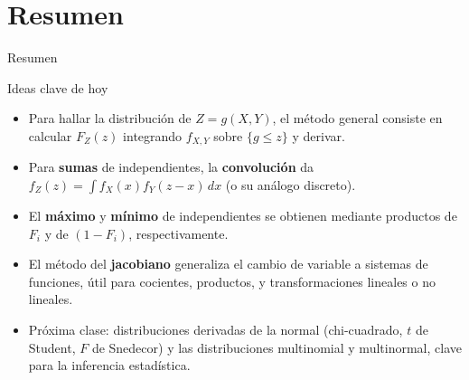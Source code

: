 \documentclass[aspectratio=169,11pt]{beamer}
\begin{document}
\section{Resumen}

\begin{frame}{Resumen}
\begin{block}{Ideas clave de hoy}
\begin{itemize}
\item Para hallar la distribución de $Z=g(X,Y)$, el método general consiste en calcular $F_Z(z)$ integrando $f_{X,Y}$ sobre $\{g\le z\}$ y derivar.
\item Para \textbf{sumas} de independientes, la \textbf{convolución} da $f_Z(z) = \int f_X(x) f_Y(z-x)\,dx$ (o su análogo discreto).
\item El \textbf{máximo} y \textbf{mínimo} de independientes se obtienen mediante productos de $F_i$ y de $(1-F_i)$, respectivamente.
\item El método del \textbf{jacobiano} generaliza el cambio de variable a sistemas de funciones, útil para cocientes, productos, y transformaciones lineales o no lineales.
\item Próxima clase: distribuciones derivadas de la normal (chi-cuadrado, $t$ de Student, $F$ de Snedecor) y las distribuciones multinomial y multinormal, clave para la inferencia estadística.
\end{itemize}
\end{block}
\end{frame}
\end{document}
